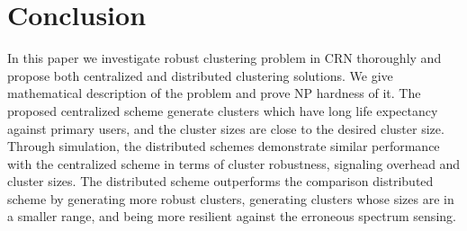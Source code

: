 \documentclass[times]{ettauth}
\theoremstyle{mytheoremstyle}
\theoremstyle{mytheoremstyle}
\theoremstyle{mytheoremstyle}
\begin{document}
\section{Conclusion}
\label{conclusion}
In this paper we investigate robust clustering problem in CRN thoroughly and propose both centralized and distributed clustering solutions.
We give mathematical description of the problem and prove NP hardness of it.
The proposed centralized scheme generate clusters which have long life expectancy against primary users, and the cluster sizes are close to the desired cluster size.
Through simulation, the distributed schemes demonstrate similar performance with the centralized scheme in terms of cluster robustness, signaling overhead and cluster sizes.
The distributed scheme outperforms the comparison distributed scheme by generating more robust clusters,  generating clusters whose sizes are in a smaller range, and being more resilient against the erroneous spectrum sensing.


%
\end{document}
